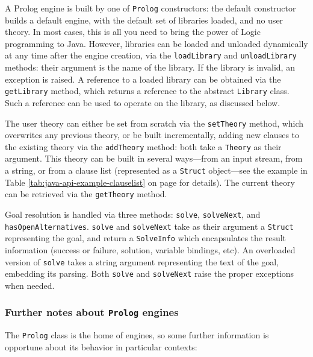 A Prolog engine is built by one of \texttt{Prolog} constructors: the default constructor builds a default engine, with the default set of \tuprolog{} libraries loaded, and no user theory. In most cases, this is all you need to bring the power of Logic programming to Java.
%
However, libraries can be loaded and unloaded dynamically at any time after the engine creation, via the \texttt{loadLibrary} and \texttt{unloadLibrary} methods: their argument is the name of the library. If the library is invalid, an exception is raised.
%
A reference to a loaded library can be obtained via the \texttt{getLibrary} method, which returns a reference to the abstract \texttt{Library} class.
%
Such a reference can be used to operate on the library, as discussed below.

The user theory can either be set from scratch via the \texttt{setTheory} method, which overwrites any previous theory, or be built incrementally, adding new clauses to the existing theory via the \texttt{addTheory} method: both take a \texttt{Theory} as their argument. This theory can be built in several ways---from an input stream, from a string, or from a clause list (represented as a \texttt{Struct} object---see the example in Table \ref{tab:java-api-example-clauselist} on page \pageref{tab:java-api-example-clauselist} for details).
%
The current theory can be retrieved via the \texttt{getTheory} method.

Goal resolution is handled via three methods: \texttt{solve}, \texttt{solveNext}, and
\texttt{hasOpenAlternatives}.
%
\texttt{solve} and \texttt{solveNext} take as their argument a \texttt{Struct} representing the goal, and return a \texttt{SolveInfo} which encapsulates the result information (success or failure, solution, variable bindings, etc).
%
An overloaded version of \texttt{solve} takes a string argument representing the text of the goal, embedding its parsing.
%
Both \texttt{solve} and \texttt{solveNext} raise the proper exceptions when needed.


\subsubsection{Further notes about \texttt{Prolog} engines}

The \texttt{Prolog} class is the home of \tuprolog{} engines, so some further information is opportune about its behavior in particular contexts:

